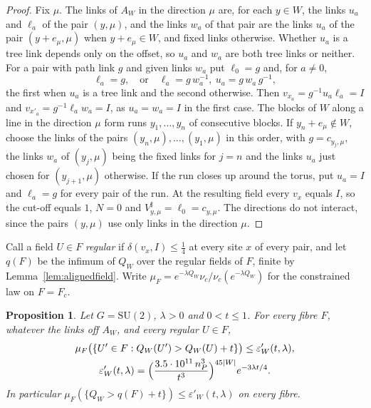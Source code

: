 \documentclass[11pt]{amsart}
\newtheorem{proposition}[theorem]{Proposition}
\theoremstyle{definition}
\theoremstyle{remark}
\numberwithin{equation}{section}
\newcommand{\SU}{\mathrm{SU}}
\begin{document}
\begin{proof}
Fix $\mu$. The links of $A_W$ in the direction $\mu$ are, for each $y\in
W$, the links $u_a$ and $\ell_a$ of the pair $(y,\mu)$, and the links $w_a$
of that pair are the links $u_a$ of the pair $(y+e_\mu,\mu)$ when $y+e_\mu
\in W$, and fixed links otherwise. Whether $u_a$ is a tree link depends only
on the offset, so $u_a$ and $w_a$ are both tree links or neither. For a pair
with path link $g$ and given links $w_a$ put $\ell_0=g$ and, for $a\ne0$,
\[
\ell_a=g,\quad\text{or}\quad\ell_a=g\,w_a^{-1},\ u_a=g\,w_a\,g^{-1},
\]
the first when $u_a$ is a tree link and the second otherwise. Then $v_{x_a}
=g^{-1}u_a\ell_a=I$ and $v_{x'_a}=g^{-1}\ell_aw_a=I$, as $u_a=w_a=I$ in the
first case. The blocks of $W$ along a line in the direction $\mu$ form runs
$y_1,\dots,y_n$ of consecutive blocks. If $y_n+e_\mu\notin W$, choose the
links of the pairs $(y_n,\mu),\dots,(y_1,\mu)$ in this order, with $g=c_{y_j,
\mu}$, the links $w_a$ of $(y_j,\mu)$ being the fixed links for $j=n$ and the
links $u_a$ just chosen for $(y_{j+1},\mu)$ otherwise. If the run closes up
around the torus, put $u_a=I$ and $\ell_a=g$ for every pair of the run. At
the resulting field every $v_x$ equals $I$, so the cut-off equals $1$, $N=0$
and $V^\sharp_{y,\mu}=\ell_0=c_{y,\mu}$. The directions do not interact,
since the pairs $(y,\mu)$ use only links in the direction $\mu$.
\end{proof}

Call a field $U\in F$ \emph{regular} if $\delta(v_x,I)\le\frac14$ at every site
$x$ of every pair, and let $q(F)$ be the infimum of $Q_W$ over the regular
fields of $F$, finite by Lemma~\ref{lem:alignedfield}. Write $\mu_F=e^{-\lambda
Q_W}\nu_c/\nu_c(e^{-\lambda Q_W})$ for the constrained law on $F=F_c$.

\begin{proposition}\label{prop:everyfibre}
Let $G=\SU(2)$, $\lambda>0$ and $0<t\le1$. For every fibre $F$, whatever the
links off $A_W$, and every regular $U\in F$,
\begin{gather*}
\mu_F\bigl(\{U'\in F:Q_W(U')>Q_W(U)+t\}\bigr)\le\varepsilon'_W(t,
\lambda),\\
\varepsilon'_W(t,\lambda)=\Bigl(\frac{3.5\cdot10^{11}\,n_P^3}{t^3}\Bigr)
^{45|W|}e^{-3\lambda t/4}.
\end{gather*}
In particular $\mu_F(\{Q_W>q(F)+t\})\le\varepsilon'_W(t,\lambda)$ on every
fibre.
\end{proposition}
\end{document}
